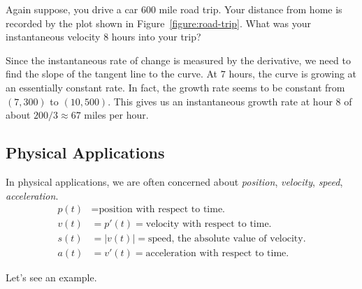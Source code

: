 \begin{example} 
Again suppose, you drive a car 600 mile road trip. Your distance from
home is recorded by the plot shown in
Figure~\ref{figure:road-trip}. What was your instantaneous velocity
$8$ hours into your trip?
\end{example}
\begin{solution}
Since the instantaneous rate of change is measured by the derivative,
we need to find the slope of the tangent line to the curve. At $7$
hours, the curve is growing at an essentially constant rate. In fact,
the growth rate seems to be constant from $(7,300)$ to
$(10,500)$. This gives us an instantaneous growth rate at hour $8$ of
about $200/3 \approx 67$ miles per hour.
\end{solution}




\subsection*{Physical Applications}

In physical applications, we are often concerned about
\textit{position}, \textit{velocity}, \textit{speed},
\textit{acceleration}.
\begin{align*}
p(t) &= \text{position with respect to time.}\\
v(t) &= p'(t) = \text{velocity with respect to time.}\\
s(t) &= |v(t)| = \text{speed, the absolute value of velocity.}\\
a(t) &=v'(t) = \text{acceleration with respect to time.}
\end{align*}

Let's see an example.

